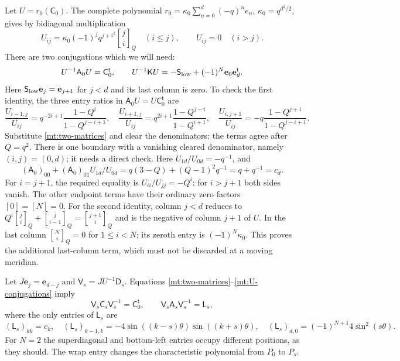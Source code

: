 \documentclass[11pt]{article}
\numberwithin{equation}{section}
\theoremstyle{definition}\newtheorem{definition}[theorem]{Definition}
\theoremstyle{remark}\newtheorem{remark}[theorem]{Remark}
\begin{document}
Let $U=r_0(\mathsf C_0)$. The complete polynomial
$r_0=\kappa_0\sum_{n=0}^d(-q)^ne_n$, $\kappa_0=q^{d^2/2}$,
gives by bidiagonal multiplication
\begin{equation}\label{mt:U}
 U_{ij}=\kappa_0(-1)^jq^{j+i^2}\genfrac{[}{]}{0pt}{}{j}{i}_Q\quad(i\le j),
 \qquad U_{ij}=0\quad(i>j).
\end{equation}
There are two conjugations which we will need:
\begin{equation}\label{mt:U-conjugations}
 U^{-1}\mathsf A_0U=\mathsf C_0^{\mathsf t},\qquad
 U^{-1}\mathsf KU=-\mathsf S_{\rm low}
                       +(-1)^N\mathbf e_0\mathbf e_d^{\mathsf t}.
\end{equation}
Here $\mathsf S_{\rm low}\mathbf e_j=\mathbf e_{j+1}$ for $j<d$
and its last column is zero. To check the first identity, the three
entry ratios in $\mathsf A_0U=U\mathsf C_0^{\mathsf t}$ are
\[
 \frac{U_{i-1,j}}{U_{ij}}=q^{-2i+1}\frac{1-Q^i}{1-Q^{j-i+1}},\quad
 \frac{U_{i+1,j}}{U_{ij}}=q^{2i+1}\frac{1-Q^{j-i}}{1-Q^{i+1}},\quad
 \frac{U_{i,j+1}}{U_{ij}}=-q\frac{1-Q^{j+1}}{1-Q^{j-i+1}}.
\]
Substitute \eqref{mt:two-matrices} and clear the denominators; the
terms agree after $Q=q^2$. There is one boundary with a vanishing cleared denominator, namely
$(i,j)=(0,d)$; it needs a direct check. Here $U_{1d}/U_{0d}=-q^{-1}$,
and
\[
 (\mathsf A_0)_{00}+(\mathsf A_0)_{01}U_{1d}/U_{0d}
 =q(3-Q)+(Q-1)^2q^{-1}=q+q^{-1}=c_d.
\]
For $i=j+1$, the required equality is $U_{ii}/U_{jj}=-Q^i$;
for $i>j+1$ both sides vanish. The other endpoint terms have their
ordinary zero factors $[0]=[N]=0$. For the second identity, column $j<d$ reduces to
$Q^i\genfrac{[}{]}{0pt}{}{j}{i}_Q+\genfrac{[}{]}{0pt}{}{j}{i-1}_Q=\genfrac{[}{]}{0pt}{}{j+1}{i}_Q$ and is the
negative of column $j+1$ of $U$. In the last column
$\genfrac{[}{]}{0pt}{}{N}{i}_Q=0$ for $1\le i<N$; its zeroth entry is
$(-1)^N\kappa_0$. This proves the additional last-column term,
which must not be discarded at a moving meridian.

Let $J\mathbf e_j=\mathbf e_{d-j}$ and
$\mathsf V_s=JU^{-1}\mathsf D_s$. Equations
\eqref{mt:two-matrices}--\eqref{mt:U-conjugations} imply
\begin{equation}\label{mt:L}
 \mathsf V_s\mathsf C_s\mathsf V_s^{-1}=\mathsf C_0^{\mathsf t},
 \qquad \mathsf V_s\mathsf A_s\mathsf V_s^{-1}=\mathsf L_s,
\end{equation}
where the only entries of $\mathsf L_s$ are
\[
 (\mathsf L_s)_{kk}=c_k,\quad
 (\mathsf L_s)_{k-1,k}=-4\sin((k-s)\theta)\sin((k+s)\theta),\quad
 (\mathsf L_s)_{d,0}=(-1)^{N+1}4\sin^2(s\theta).
\]
For $N=2$ the superdiagonal and bottom-left entries occupy different
positions, as they should. The wrap entry changes the characteristic
polynomial from $P_0$ to $P_s$.
\end{document}
